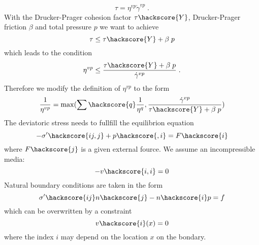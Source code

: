 \begin{equation}\label{IKM-EQU-8b}
\tau = \eta^{vp} \dot{\gamma}^{vp} \;.
\end{equation}
With the Drucker-Prager cohesion factor $\tau\hackscore{Y}$, Drucker-Prager friction $\beta$ and total pressure $p$ we want to achieve 
\begin{equation}\label{IKM-EQU-8c}
\tau \le \tau\hackscore{Y} + \beta \; p
\end{equation}
which leads to the condition
\begin{equation}\label{IKM-EQU-8d}
\eta^{vp} \le \frac{\tau\hackscore{Y} + \beta \; p}{ \dot{\gamma}^{vp}} \; .
\end{equation}
Therefore we modify the definition of $\eta^{vp}$ to the form
\begin{equation}\label{IKM-EQU-6b}
\frac{1}{\eta^{vp}}=\max(\sum\hackscore{q} \frac{1}{\eta^{q}}, \frac{\dot{\gamma}^{vp}} {\tau\hackscore{Y} + \beta \; p})
\end{equation}
The deviatoric stress needs to fullfill the equilibrion equation
\begin{equation}\label{IKM-EQU-1}
-\sigma'\hackscore{ij,j}+p\hackscore{,i}=F\hackscore{i}
\end{equation}
where $F\hackscore{j}$ is a given external fource. We assume an incompressible media:
\begin{equation}\label{IKM-EQU-2}
-v\hackscore{i,i}=0
\end{equation}
Natural boundary conditions are taken in the form 
\begin{equation}\label{IKM-EQU-Boundary}
\sigma'\hackscore{ij}n\hackscore{j}-n\hackscore{i}p=f
\end{equation}
which can be overwritten by a constraint 
\begin{equation}\label{IKM-EQU-Boundary0}
v\hackscore{i}(x)=0
\end{equation}
where the index $i$ may depend on the location $x$ on the bondary.

